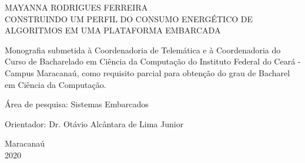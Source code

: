 \begin{titlepage}
\vfill
\begin{center}

    {\large MAYANNA RODRIGUES FERREIRA\\}
    \vspace{2cm}
    {\Large \textsc{CONSTRUINDO UM PERFIL DO CONSUMO ENERGÉTICO DE ALGORITMOS EM UMA PLATAFORMA EMBARCADA}\\}
    \vspace{1cm}
    \hspace{.45\linewidth}
    \begin{minipage}{.50\linewidth}

            Monografia submetida à Coordenadoria de Telemática e à Coordenadoria do Curso de Bacharelado 
            em Ciência da Computação do Instituto Federal do Ceará - Campus Maracanaú, como requisito 
            parcial para obtenção do grau de Bacharel em Ciência da Computação.

            \vspace{0.5 cm}

            Área de pesquisa: Sistemas Embarcados 
            

            \vspace{0.5 cm}

            Orientador: Dr. Otávio Alcântara de Lima Junior 
    
    \end{minipage}

    \vspace{2cm}
    \vfill
    {\large Maracanaú\\ 2020}
\end{center}

\end{titlepage}